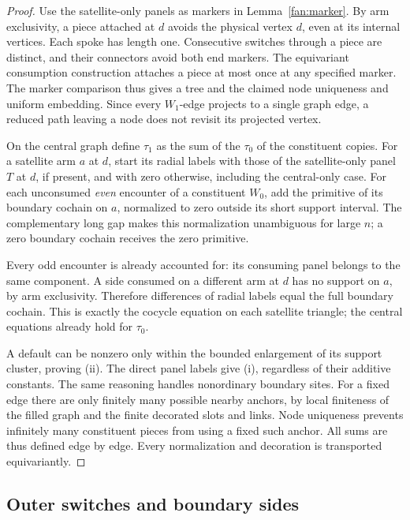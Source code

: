 \begin{proof}
Use the satellite-only panels as markers in Lemma~\ref{fan:marker}. By arm
exclusivity, a piece attached at $d$ avoids the physical vertex $d$, even at
its internal vertices. Each spoke has length one. Consecutive switches
through a piece are distinct, and their connectors avoid both end markers.
The equivariant consumption construction attaches a piece at most once at
any specified marker. The marker comparison thus gives a tree and the
claimed node uniqueness and uniform embedding. Since every $W_1$-edge
projects to a single graph edge, a reduced path leaving a node does not
revisit its projected vertex.

On the central graph define $\tau_1$ as the sum of the $\tau_0$ of the
constituent copies. For a satellite arm $a$ at $d$, start its radial labels
with those of the satellite-only panel $T$ at $d$, if present, and with zero
otherwise, including the central-only case. For each unconsumed
\emph{even} encounter of a constituent $W_0$, add the primitive of its
boundary cochain on $a$, normalized to zero outside its short support
interval. The complementary long gap makes this normalization unambiguous
for large $n$; a zero boundary cochain receives the zero primitive.

Every odd encounter is already accounted for: its consuming panel belongs
to the same component. A side consumed on a different arm at $d$ has no
support on $a$, by arm exclusivity. Therefore differences of radial labels
equal the full boundary cochain. This is exactly the cocycle equation on
each satellite triangle; the central equations already hold for $\tau_0$.

A default can be nonzero only within the bounded enlargement of its support
cluster, proving (ii). The direct panel labels give (i), regardless of their
additive constants. The same reasoning handles nonordinary boundary sites.
For a fixed edge there are only finitely many possible nearby anchors, by
local finiteness of the filled graph and the finite decorated slots and
links. Node uniqueness prevents infinitely many constituent pieces from
using a fixed such anchor. All sums are thus defined edge by edge. Every
normalization and decoration is transported equivariantly.
\end{proof}

\subsection{Outer switches and boundary sides}

